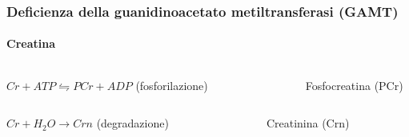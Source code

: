 \begin{frame}
\frametitle {Deficienza della guanidinoacetato metiltransferasi (GAMT)}
\framesubtitle {Creatina}
\begin{columns}
	$Cr + ATP \leftrightharpoons PCr + ADP$ (fosforilazione)
	\begin{figure}
	\end{figure}
	\centering Fosfocreatina (PCr)
	\end{columns}
	
	\begin{columns}
	$Cr + H_2O \rightarrow Crn$ (degradazione)
	\begin{figure}
	\end{figure}
	\centering Creatinina (Crn)
\end{columns}



\end{frame}
